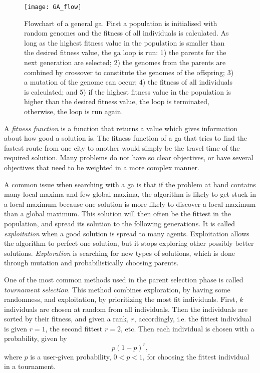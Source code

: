 \begin{figure}[htbp]
    \centering
    \texttt{[image: GA\_flow]}
    \caption[Flowchart of a general \ac{ga}.]{Flowchart of a general \ac{ga}. First a population is initialised with random genomes and the fitness of all individuals is calculated. As long as the highest fitness value in the population is smaller than the desired fitness value, the \ac{ga} loop is run: 1) the parents for the next generation are selected; 2) the genomes from the parents are combined by crossover to constitute the genomes of the offspring; 3) a mutation of the genome can occur; 4) the fitness of all individuals is calculated; and 5) if the highest fitness value in the population is higher than the desired fitness value, the loop is terminated, otherwise, the loop is run again.}
    \label{fig:GA}
\end{figure}

A \textit{fitness function} is a function that returns a value which gives information about how good a solution is. The fitness function of a \ac{ga} that tries to find the fastest route from one city to another would simply be the travel time of the required solution. Many problems do not have so clear objectives, or have several objectives that need to be weighted in a more complex manner.

A common issue when searching with a \ac{ga} is that if the problem at hand contains many local maxima and few global maxima, the algorithm is likely to get stuck in a local maximum because one solution is more likely to discover a local maximum than a global maximum. This solution will then often be the fittest in the population, and spread its solution to the following generations. It is called \textit{exploitation} when a good solution is spread to many agents. Exploitation allows the algorithm to perfect one solution, but it stops exploring other possibly better solutions. \textit{Exploration} is searching for new types of solutions, which is done through mutation and probabilistically choosing parents. 

One of the most common methods used in the parent selection phase is called \textit{tournament selection}. This method combines exploration, by having some randomness, and exploitation, by prioritizing the most fit individuals. First, $k$ individuals are chosen at random from all individuals. Then the individuals are sorted by their fitness, and given a rank, $r$, accordingly, i.e. the fittest individual is given $r=1$, the second fittest $r=2$, etc. Then each individual is chosen with a probability, given by
\begin{equation}
p(1-p)^r,
\end{equation}
where $p$ is a user-given probability, $0 < p < 1$, for choosing the fittest individual in a tournament. 

